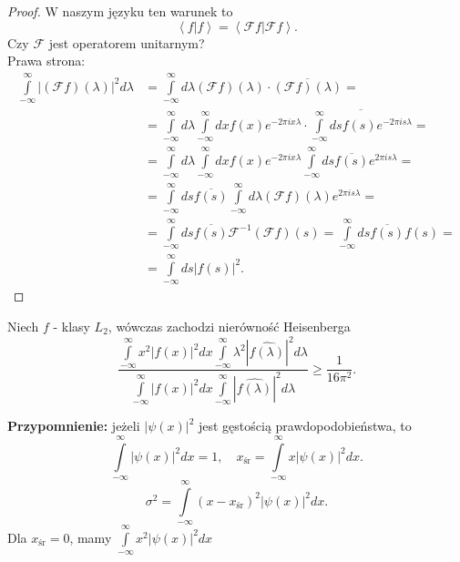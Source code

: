 \documentclass[../main.tex]{subfiles}
\begin{document}
    \begin{proof}
        W naszym języku ten warunek to
        \[
            \left<f|f \right> = \left<\mathcal{F}f | \mathcal{F}f \right>
        .\]
    Czy $\mathcal{F}$ jest operatorem unitarnym?\\
        Prawa strona:
        \begin{align*}
            \int\limits_{-\infty}^{\infty} \left|\left(\mathcal{F}f\right)(\lambda)\right|^2d\lambda &= \int\limits_{-\infty}^{\infty} d\lambda \left( \mathcal{F}f \right) (\lambda)\cdot \overline{(\mathcal{F}f)(\lambda)} =\\
            &=\int\limits_{-\infty}^{\infty} d\lambda \int\limits_{-\infty}^{\infty} dx f(x) e^{-2\pi i x \lambda} \cdot \overline{\int\limits_{-\infty}^{\infty} ds f(s) e^{-2\pi i s \lambda}} = \\
            &= \int\limits_{-\infty}^{\infty} d\lambda \int\limits_{-\infty}^{\infty} dx f(x) e^{-2\pi i x \lambda}\int\limits_{-\infty}^{\infty} ds \overline{f(s)}e^{2\pi i s \lambda} = \\
            &= \int\limits_{-\infty}^{\infty} ds \overline{f(s)}\int\limits_{-\infty}^{\infty} d\lambda (\mathcal{F}f)(\lambda)e^{2\pi i s \lambda} = \\
            &= \int\limits_{-\infty}^{\infty} ds \overline{f(s)} \mathcal{F}^{-1}(\mathcal{F}f)(s) = \int\limits_{-\infty}^{\infty} ds \overline{f(s)} f(s) = \\
            &= \int\limits_{-\infty}^{\infty} ds \left| f(s) \right| ^2
        .\end{align*}
    \end{proof}
    \begin{stw}
        Niech $f$ - klasy $L_2$, wówczas zachodzi nierówność Heisenberga
        \[
            \frac{\int\limits_{-\infty}^{\infty} x^2 \left| f(x) \right| ^2 dx \int\limits_{-\infty}^{\infty} \lambda^2 \left| \widehat{f(\lambda)} \right| ^2 d\lambda}{\int\limits_{-\infty}^{\infty} \left| f(x) \right| ^2 dx \int\limits_{-\infty}^{\infty} \left| \widehat{f(\lambda)} \right| ^2 d\lambda } \ge \frac{1}{16\pi^2}
        .\]
    \end{stw}
    \textbf{Przypomnienie:} jeżeli $\left| \psi(x) \right| ^2$ jest gęstością prawdopodobieństwa, to
    \[
        \int\limits_{-\infty}^{\infty} \left| \psi(x) \right| ^2 dx = 1,\quad x_{\text{śr}} = \int\limits_{-\infty}^{\infty}  x \left| \psi(x) \right| ^2 dx
    .\]
\[
    \sigma^2 = \int\limits_{-\infty}^{\infty} (x-x_{\text{śr}})^2 \left| \psi(x) \right| ^2 dx
.\]
Dla $x_{\text{śr}} = 0$, mamy $\int\limits_{-\infty}^{\infty} x^2 \left| \psi(x) \right| ^2 dx $
\end{document}
